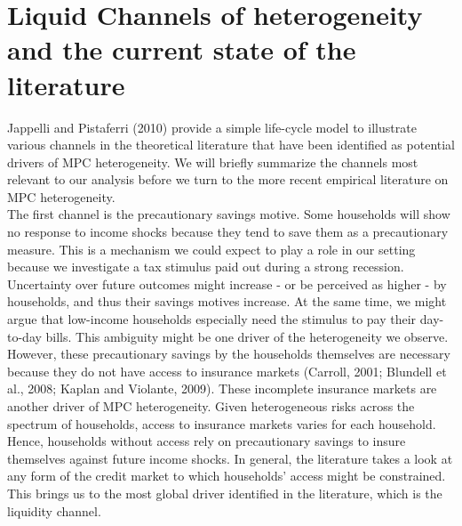 \section{Liquid Channels of heterogeneity and the current state of the literature} \label{sec:lit}
Jappelli and Pistaferri (2010) provide a simple life-cycle model to illustrate various channels in the theoretical literature that have been identified as potential drivers of MPC heterogeneity. We will briefly summarize the channels most relevant to our analysis before we turn to the more recent empirical literature on MPC heterogeneity. \\
The first channel is the precautionary savings motive. Some households will show no response to income shocks because they tend to save them as a precautionary measure. This is a mechanism we could expect to play a role in our setting because we investigate a tax stimulus paid out during a strong recession. Uncertainty over future outcomes might increase - or be perceived as higher - by households, and thus their savings motives increase. At the same time, we might argue that low-income households especially need the stimulus to pay their day-to-day bills. This ambiguity might be one driver of the heterogeneity we observe. \\
However, these precautionary savings by the households themselves are necessary because they do not have access to insurance markets (Carroll, 2001; Blundell et al., 2008; Kaplan and Violante, 2009). These incomplete insurance markets are another driver of MPC heterogeneity. Given heterogeneous risks across the spectrum of households, access to insurance markets varies for each household. Hence, households without access rely on precautionary savings to insure themselves against future income shocks. In general, the literature takes a look at any form of the credit market to which households' access might be constrained. This brings us to the most global driver identified in the literature, which is the liquidity channel. \\
